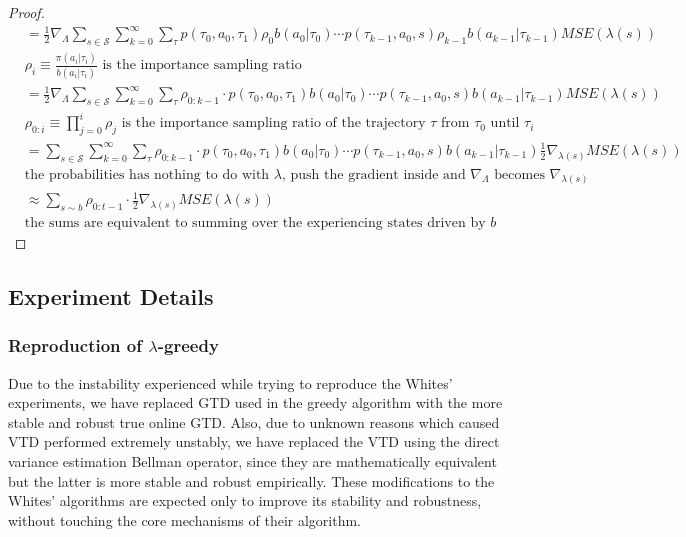 \documentclass{article}
\newcommand\scriptS{\mathcal{S}}
\begin{document}
\begin{proof}
\begin{equation}
\begin{aligned}
& = \frac{1}{2} \nabla_{\Lambda} \sum_{s \in \scriptS}{\sum_{k=0}^{\infty}{\sum_{\tau}{p(\tau_0, a_0, \tau_1) \rho_{0} b(a_0|\tau_0) \cdots p(\tau_{k-1}, a_0, s) \rho_{k-1} b(a_{k-1}|\tau_{k-1}) MSE(\lambda(s))}}}\\
& \text{$\rho_{i} \equiv \frac{\pi(a_i | \tau_i)}{b(a_i | \tau_i)}$ is the importance sampling ratio}\\
& = \frac{1}{2} \nabla_{\Lambda} \sum_{s \in \scriptS}{\sum_{k=0}^{\infty}{\sum_{\tau}{\rho_{0:k-1} \cdot p(\tau_0, a_0, \tau_1)  b(a_0|\tau_0) \cdots p(\tau_{k-1}, a_0, s) b(a_{k-1}|\tau_{k-1}) MSE(\lambda(s))}}}\\
& \text{$\rho_{0:i} \equiv \prod_{j=0}^{i}{\rho_{j}}$ is the importance sampling ratio of the trajectory $\tau$ from $\tau_0$ until $\tau_i$}\\
& = \sum_{s \in \scriptS}{\sum_{k=0}^{\infty}{\sum_{\tau}{\rho_{0:k-1} \cdot p(\tau_0, a_0, \tau_1)  b(a_0|\tau_0) \cdots p(\tau_{k-1}, a_0, s) b(a_{k-1}|\tau_{k-1}) \frac{1}{2} \nabla_{\lambda(s)} MSE(\lambda(s))}}}\\
& \text{the probabilities has nothing to do with $\lambda$, push the gradient inside and $\nabla_{\Lambda}$ becomes $\nabla_{\lambda(s)}$}\\
& \approx \sum_{s \sim b}{\rho_{0:t-1} \cdot \frac{1}{2} \nabla_{\lambda(s)} MSE(\lambda(s))}\\
& \text{the sums are equivalent to summing over the experiencing states driven by $b$}
\end{aligned}\nonumber
\end{equation}
\end{proof}
\subsection{Experiment Details}
\subsubsection{Reproduction of $\lambda$-greedy}
Due to the instability experienced while trying to reproduce the Whites' experiments, we have replaced GTD used in the greedy algorithm with the more stable and robust true online GTD. Also, due to unknown reasons which caused VTD performed extremely unstably, we have replaced the VTD using the direct variance estimation Bellman operator, since they are mathematically equivalent but the latter is more stable and robust empirically. These modifications to the Whites' algorithms are expected only to improve its stability and robustness, without touching the core mechanisms of their algorithm.
\end{document}
